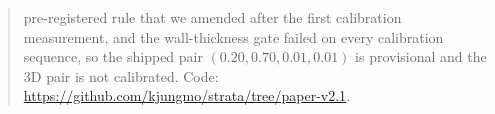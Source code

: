 \begin{abstract}
pre-registered rule that we amended after the first calibration measurement, and the wall-thickness gate failed on every calibration sequence, so the shipped pair $(0.20,0.70,0.01,0.01)$ is provisional and the 3D pair is not calibrated. Code: \url{https://github.com/kjungmo/strata/tree/paper-v2.1}.
\end{abstract}
